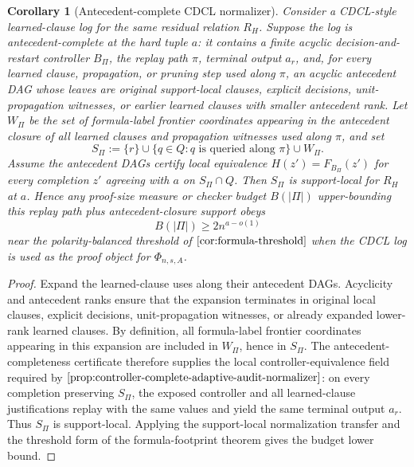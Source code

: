 \documentclass[11pt]{article}
\newtheorem{corollary}[theorem]{Corollary}
\theoremstyle{definition}
\begin{document}
\begin{corollary}[Antecedent-complete CDCL normalizer]\label{cor:antecedent-complete-cdcl}
Consider a CDCL-style learned-clause log for the same residual relation \(R_H\).  Suppose the log is antecedent-complete at the hard tuple \(a\): it contains a finite acyclic decision-and-restart controller \(B_\Pi\), the replay path \(\pi\), terminal output \(a_r\), and, for every learned clause, propagation, or pruning step used along \(\pi\), an acyclic antecedent DAG whose leaves are original support-local clauses, explicit decisions, unit-propagation witnesses, or earlier learned clauses with smaller antecedent rank.  Let \(W_\Pi\) be the set of formula-label frontier coordinates appearing in the antecedent closure of all learned clauses and propagation witnesses used along \(\pi\), and set
\[
  S_\Pi:=\{r\}\cup\{q\in Q:q\text{ is queried along }\pi\}\cup W_\Pi .
\]
Assume the antecedent DAGs certify local equivalence \(H(z')=F_{B_\Pi}(z')\) for every completion \(z'\) agreeing with \(a\) on \(S_\Pi\cap Q\).  Then \(S_\Pi\) is support-local for \(R_H\) at \(a\).  Hence any proof-size measure or checker budget \(B(|\Pi|)\) upper-bounding this replay path plus antecedent-closure support obeys
\[
  B(|\Pi|)\ge 2n^{a-o(1)}
\]
near the polarity-balanced threshold of \(\Cref{cor:formula-threshold}\) when the CDCL log is used as the proof object for \(\Phi_{n,s,A}\).
\end{corollary}

\begin{proof}
Expand the learned-clause uses along their antecedent DAGs.  Acyclicity and antecedent ranks ensure that the expansion terminates in original local clauses, explicit decisions, unit-propagation witnesses, or already expanded lower-rank learned clauses.  By definition, all formula-label frontier coordinates appearing in this expansion are included in \(W_\Pi\), hence in \(S_\Pi\).  The antecedent-completeness certificate therefore supplies the local controller-equivalence field required by \(\Cref{prop:controller-complete-adaptive-audit-normalizer}\): on every completion preserving \(S_\Pi\), the exposed controller and all learned-clause justifications replay with the same values and yield the same terminal output \(a_r\).  Thus \(S_\Pi\) is support-local.  Applying the support-local normalization transfer and the threshold form of the formula-footprint theorem gives the budget lower bound.
\end{proof}
\end{document}
